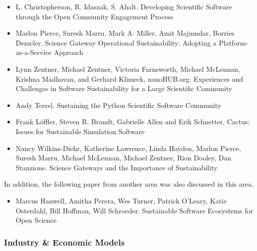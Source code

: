 \documentclass[11pt, oneside]{amsart}
\begin{document}
\begin{itemize}

\item L. Christopherson, R. Idaszak, S. Ahalt. Developing Scientific Software through the Open Community Engagement Process \cite{Christopherson_WSSSPE}

\item Marlon Pierce, Suresh Marru, Mark A. Miller, Amit Majumdar, Borries Demeler. Science Gateway Operational Sustainability: Adopting a Platform-as-a-Service Approach \cite{Pierce2_WSSSPE}

\item Lynn Zentner, Michael Zentner, Victoria Farnsworth, Michael
  McLennan, Krishna Madhavan, and Gerhard Klimeck, nanoHUB.org:
  Experiences and Challenges in Software Sustainability for a Large
  Scientific Community \cite{Zentner_WSSSPE}

\item Andy Terrel. Sustaining the Python Scientific Software Community
  \cite{Terrel_WSSSPE}

\item Frank L\"{o}ffler, Steven R. Brandt, Gabrielle Allen and Erik
  Schnetter. Cactus: Issues for Sustainable Simulation Software
  \cite{Loffler_WSSSPE}

\item Nancy Wilkins-Diehr, Katherine Lawrence, Linda Hayden, Marlon Pierce, Suresh Marru, Michael McLennan, Michael Zentner, Rion Dooley, Dan Stanzione. Science Gateways and the Importance of Sustainability \cite{Wilkins-Diehr_WSSSPE}

\end{itemize}

In addition, the following paper from another area was also discussed
in this area.

\begin{itemize}

\item Marcus Hanwell, Amitha Perera, Wes Turner, Patrick O'Leary,
  Katie Osterdahl, Bill Hoffman, Will Schroeder. Sustainable Software
  Ecosystems for Open Science \cite{Hanwell_WSSSPE}

\end{itemize}

\subsubsection*{Industry \& Economic Models}
\end{document}
